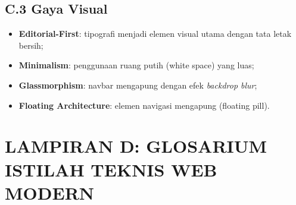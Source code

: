 \documentclass[12pt,a4paper]{report}
\begin{document}
\section*{C.3 Gaya Visual}

\begin{itemize}[leftmargin=2em, itemsep=2pt]
    \item \textbf{Editorial-First}: tipografi menjadi elemen visual utama dengan tata letak bersih;
    \item \textbf{Minimalism}: penggunaan ruang putih (white space) yang luas;
    \item \textbf{Glassmorphism}: navbar mengapung dengan efek \emph{backdrop blur};
    \item \textbf{Floating Architecture}: elemen navigasi mengapung (floating pill).
\end{itemize}

\clearpage

\chapter{LAMPIRAN D: GLOSARIUM ISTILAH TEKNIS WEB MODERN}
\end{document}
